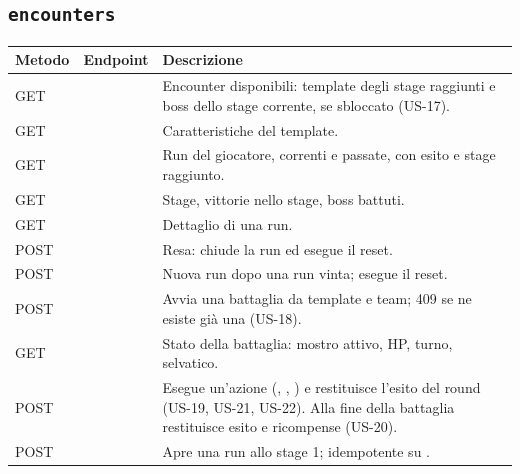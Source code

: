 \documentclass[11pt,a4paper]{article}
\begin{document}
\subsection{\texttt{encounters}}

{\small\begin{tabularx}{\linewidth}{@{}L{1.3cm}L{6.1cm}Y@{}}
  \toprule
  Metodo & Endpoint & Descrizione \\
  \midrule
  GET &  & Encounter disponibili: template degli stage raggiunti e boss dello stage corrente, se sbloccato (US-17). \\
  GET &  & Caratteristiche del template. \\
  GET &  & Run del giocatore, correnti e passate, con esito e stage raggiunto. \\
  GET &  & Stage, vittorie nello stage, boss battuti. \\
  GET &  & Dettaglio di una run. \\
  POST &  & Resa: chiude la run ed esegue il reset. \\
  POST &  & Nuova run dopo una run vinta; esegue il reset. \\
  POST &  & Avvia una battaglia da template e team; 409 se ne esiste già una (US-18). \\
  GET &  & Stato della battaglia: mostro attivo, HP, turno, selvatico. \\
  POST &  & Esegue un'azione (, , ) e restituisce l'esito del round (US-19, US-21, US-22). Alla fine della battaglia restituisce esito e ricompense (US-20). \\
  POST &  & Apre una run allo stage 1; idempotente su . \\
  \bottomrule
\end{tabularx}}
\end{document}
